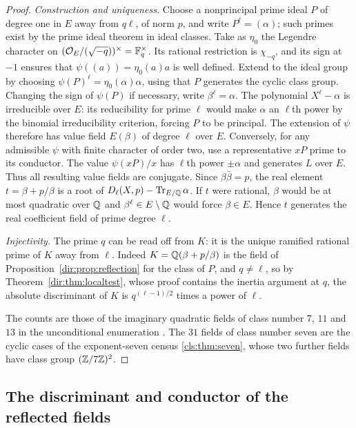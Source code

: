 \begin{proof}
\emph{Construction and uniqueness.} Choose a nonprincipal prime ideal $P$ of degree one
in $E$ away from $q\ell$, of norm $p$, and write $P^\ell=(\alpha)$; such primes exist
by the prime ideal theorem in ideal classes. Take as $\eta_0$ the Legendre character
on $(\mathcal{O}_E/(\sqrt{-q}))^\times=\mathbb{F}_q^\times$. Its rational restriction is $\chi_{-q}$,
and its sign at $-1$ ensures that $\psi((a))=\eta_0(a)a$ is well defined. Extend to the
ideal group by choosing $\psi(P)^\ell=\eta_0(\alpha)\alpha$, using that $P$ generates
the cyclic class group. Changing the sign of $\psi(P)$ if necessary, write
$\beta^\ell=\alpha$. The polynomial $X^\ell-\alpha$ is irreducible over $E$: its
reducibility for prime $\ell$ would make $\alpha$ an $\ell$th power by the binomial
irreducibility criterion, forcing $P$ to be principal. The extension of $\psi$
therefore has value field $E(\beta)$ of degree $\ell$ over $E$. Conversely, for any
admissible $\psi$ with finite character of order two, use a representative $xP$ prime
to its conductor. The value $\psi(xP)/x$ has $\ell$th power $\pm\alpha$ and generates
$L$ over $E$. Thus all resulting value fields are conjugate. Since $\beta\bar\beta=p$,
the real element $t=\beta+p/\beta$ is a root of $D_\ell(X,p)-\operatorname{Tr}_{E/\mathbb{Q}}\alpha$. If $t$
were rational, $\beta$ would be at most quadratic over $\mathbb{Q}$ and
$\beta^\ell\in E\setminus\mathbb{Q}$ would force $\beta\in E$. Hence $t$ generates the real
coefficient field of prime degree $\ell$.

\emph{Injectivity.} The prime $q$ can be read off from $K$: it is the unique ramified
rational prime of $K$ away from $\ell$. Indeed $K=\mathbb{Q}(\beta+p/\beta)$ is the field of
Proposition~\ref{dir:prop:reflection} for the class of $P$, and $q\ne\ell$, so by
Theorem~\ref{dir:thm:localtest}, whose proof contains the inertia argument at $q$, the
absolute discriminant of $K$ is $q^{(\ell-1)/2}$ times a power of $\ell$.

The counts are those of the imaginary quadratic fields of class number $7$, $11$ and
$13$ in the unconditional enumeration \cite{Watkins2004Class}. The $31$ fields of class
number seven are the cyclic cases of the exponent-seven census \cref{cls:thm:seven}, whose
two further fields have class group $(\mathbb{Z}/7\mathbb{Z})^2$.
\end{proof}




\subsection{The discriminant and conductor of the reflected fields}
\label{dir:sec:reflected}

